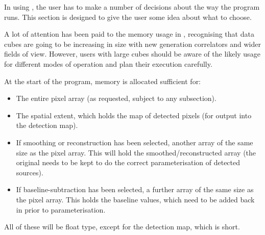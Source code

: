%
%
%
%
\label{sec-notes}

In using \duchamp, the user has to make a number of decisions about
the way the program runs. This section is designed to give the user
some idea about what to choose.


A lot of attention has been paid to the memory usage in \duchamp,
recognising that data cubes are going to be increasing in size with
new generation correlators and wider fields of view. However, users
with large cubes should be aware of the likely usage for different
modes of operation and plan their \duchamp execution carefully. 

At the start of the program, memory is allocated sufficient for:
\begin{itemize}
\item The entire pixel array (as requested, subject to any
subsection).
\item The spatial extent, which holds the map of detected pixels (for
output into the detection map).
\item If smoothing or reconstruction has been selected, another array
of the same size as the pixel array. This will hold the
smoothed/reconstructed array (the original needs to be kept to do the
correct parameterisation of detected sources).
\item If baseline-subtraction has been selected, a further array of
the same size as the pixel array. This holds the baseline values,
which need to be added back in prior to parameterisation.
\end{itemize}
All of these will be float type, except for the detection map, which
is short.

